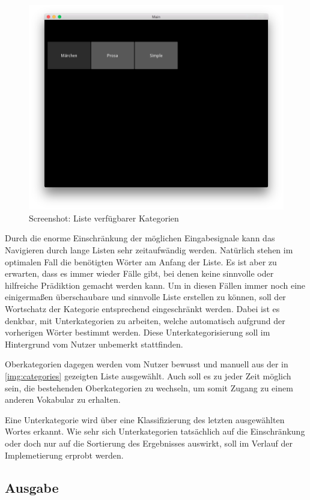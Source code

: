         \begin{figure}[H]
    		\centering
    		\includegraphics[width=.6\linewidth]{images/kategorien.png}
    		\caption[Aufbau der Grafischen Benutzeroberfläche]{Screenshot: Liste verfügbarer Kategorien}
    		\label{img:categories}
		\end{figure}
        
        Durch die enorme Einschränkung der möglichen Eingabesignale kann das Navigieren durch lange Listen sehr zeitaufwändig werden. Natürlich stehen im optimalen Fall die benötigten Wörter am Anfang der Liste. Es ist aber zu erwarten, dass es immer wieder Fälle gibt, bei denen keine sinnvolle oder hilfreiche Prädiktion gemacht werden kann. Um in diesen Fällen immer noch eine einigermaßen überschaubare und sinnvolle Liste erstellen zu können, soll der Wortschatz der Kategorie entsprechend eingeschränkt werden. Dabei ist es denkbar, mit Unterkategorien zu arbeiten, welche automatisch aufgrund der vorherigen Wörter bestimmt werden. Diese Unterkategorisierung soll im Hintergrund vom Nutzer unbemerkt stattfinden. 
        
        Oberkategorien dagegen werden vom Nutzer bewusst und manuell aus der in \autoref{img:categories} gezeigten Liste ausgewählt. Auch soll es zu jeder Zeit möglich sein, die bestehenden Oberkategorien zu wechseln, um somit Zugang zu einem anderen Vokabular zu erhalten.
        
        Eine Unterkategorie wird über eine Klassifizierung des letzten ausgewählten Wortes erkannt. Wie sehr sich Unterkategorien tatsächlich auf die Einschränkung oder doch nur auf die Sortierung des Ergebnisses auswirkt, soll im Verlauf der Implemetierung erprobt werden.
        
	\subsection{Ausgabe}
        
